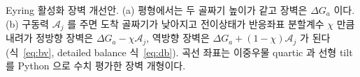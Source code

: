 \caption{Eyring 활성화 장벽 개선안. (a) 평형에서는 두 골짜기 높이가 같고 장벽은 $\Delta G_a$ 이다. (b) 구동력 $\mathcal A_j$ 를 주면 도착 골짜기가 낮아지고 전이상태가 반응좌표 분할계수 $\chi$ 만큼 내려가 정방향 장벽은 $\Delta G_a-\chi\mathcal A_j$, 역방향 장벽은 $\Delta G_a+(1-\chi)\mathcal A_j$ 가 된다(식~\eqref{eq:bv}, detailed balance 식~\eqref{eq:db}). 곡선 좌표는 이중우물 quartic 과 선형 tilt 를 Python 으로 수치 평가한 장벽 개형이다.}
\label{fig:barrier}
